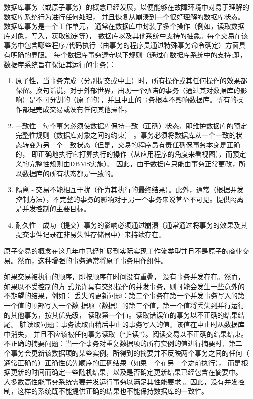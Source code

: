 数据库事务（或原子事务）的概念已经发展，以便能够在故障环境中对易于理解的数据库系统行为进行任何处理，
并且恢复从崩溃到一个很好理解的数据库状态。数据库事务是一个工作单元，
通常在数据库中封装了多个操作（例如，读取数据库对象，写入，获取锁定等），
数据库以及其他系统中支持的抽象。每个交易在该事务中包含哪些程序/代码执行（由事务的程序员通过特殊事务命令确定）方面具有明确的界限。
每个数据库事务遵守以下规则（通过在数据库系统中的支持;即，数据库系统旨在保证其运行的事务）：
\begin{enumerate}
	\item 原子性，当事务完成（分别提交或中止）时，所有操作或其任何操作的效果都保留。换句话说，对于外部世界，出现一个承诺的事务（通过其对数据库的影响）是不可分割的（原子的），并且中止的事务根本不影响数据库。所有的操作都是完成交易或没有任何其他操作。
	\item 一致性 - 每个事务必须使数据库保持一致（正确）状态，即维护数据库的预定完整性规则（数据库对象之间的约束）
	。事务必须将数据库从一个一致的状态转变为另一个一致状态（但是，交易的程序员有责任确保事务本身是正确的，
	即正确地执行它打算执行的操作（从应用程序的角度来看视图），而预定义的完整性规则由DBMS实施）。
	因此，由于数据库只能由事务正常更改，所以数据库的所有状态都是一致的。
	\item 隔离 - 交易不能相互干扰（作为其执行的最终结果）。此外，通常（根据并发控制方法），不完整的事务的影响对于另一个事务来说甚至不可见。提供隔离是并发控制的主要目标。
	\item 耐久性 - 成功（提交）事务的影响必须通过崩溃（通常通过将事务的效果及其提交事件记录在非易失性存储器中）来持续存在。
\end{enumerate}
原子交易的概念在这几年中已经扩展到实际实现工作流类型并且不是原子的商业交易。然而，这种增强的事务通常将原子事务用作组件。

如果交易被执行的顺序，即按顺序在时间没有重叠，
没有事务并发存在。然而，如果以不受控制的方
式允许具有交织操作的并发事务，则可能会发生一些意外的不期望的结果，例如：
丢失的更新问题：第二个事务在第一个并发事务写入的第一个值的顶部写入一个数
据项（数据）的第二个值，第一个值将丢失到并行运行的其他事务，按其优先级，
读取第一个值。读取错误值的事务以不正确的结果结尾。
脏读取问题：事务读取由稍后中止的事务写入的值。该值在中止时从数据库中消失，
并且不应该被任何事务读取（“脏读”）。阅读交易以不正确的结果结束。
不正确的摘要问题：当一个事务对重复数据项的所有实例的值进行摘要时，第二
个事务会更新该数据项的某些实例。所得到的摘要并不反映两个事务之间的任何（
通常正确的）正确性优先顺序的正确结果（如果一个在另一个之前执行），
而是根据更新的时间而确定一些随机结果，以及是否确定更新结果已经包含在摘要中。
大多数高性能事务系统需要并发运行事务以满足其性能要求
。因此，没有并发控制，这样的系统既不能提供正确的结果也不能保持数据库的一致性。


